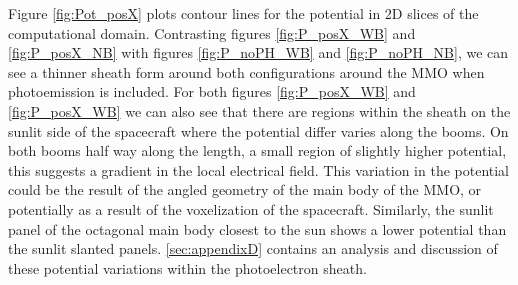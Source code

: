 Figure \ref{fig:Pot_posX} plots contour lines for the potential in 2D slices of the computational domain. Contrasting figures \ref{fig:P_posX_WB} and \ref{fig:P_posX_NB} with figures \ref{fig:P_noPH_WB} and \ref{fig:P_noPH_NB}, we can see a thinner sheath form around both configurations around the MMO when photoemission is included. For both figures \ref{fig:P_posX_WB} and \ref{fig:P_posX_WB} we can also see that there are regions within the sheath on the sunlit side of the spacecraft where the potential differ varies along the booms. On both booms half way along the length, a small region of slightly higher potential, this suggests a gradient in the local electrical field. This variation in the potential could be the result of the angled geometry of the main body of the MMO, or potentially as a result of the voxelization of the spacecraft. Similarly, the sunlit panel of the octagonal main body closest to the sun shows a lower potential than the sunlit slanted panels. \cref{sec:appendixD} contains an analysis and discussion of these potential variations within the photoelectron sheath.



